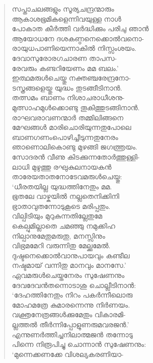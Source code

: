 \begin{verse}
സപ്താചലങ്ങളും സൂര്യചന്ദ്രന്മാരും\\
ആകാശഭൂമികളെന്നിവയുള്ള നാള്‍\\
പോകാത കീര്‍ത്തി വര്‍ദ്ധിക്കും പരിചു ഞാന്‍\\
ആയോധനേ ദശകണ്ഠനെക്കൊല്‍വനൊ-\\
രായുധപാണിയെന്നാകില്‍ നിസ്സംശയം.\\
ദേവാസുരോരഗചാരണ താപസ-\\
രേവരും കണ്ടറിയേണം മമ ബലം.’\\
ഇത്ഥമരുള്‍ചെയ്തു നക്തഞ്ചരേന്ദ്രനോ-\\
ടസ്ത്രങ്ങളെയ്തു യുദ്ധം തുടങ്ങീടിനാന്‍.\\
തത്സമം ബാണം നിശാചരാധീശനു-\\
മുത്സാഹമുള്‍ക്കൊണ്ടു തൂകിത്തുടങ്ങിനാന്‍.\\
രാഘവരാവണന്മാര്‍ തമ്മിലിങ്ങനെ\\
മേഘങ്ങള്‍ മാരിചൊരിയുന്നതുപോലെ\\
ബാണഗണംപൊഴിച്ചീടുന്നതുനേരം\\
ഞാണൊലികൊണ്ടു മുഴങ്ങി ജഗത്ത്രയം.\\
സോദരന്‍ വീണു കിടക്കുന്നതോര്‍ത്തുള്ളി-\\
ലാധി മുഴുത്തു രഘുകുലനായകന്‍\\
താരേയതാതനോടേവമരുള്‍ചെയ്തു:\\
‘ധീരതയില്ല യുദ്ധത്തിനേതും മമ.\\
ഭൂതലേ വാഴ്കയില്‍ നല്ലതെനിക്കിനി\\
ഭ്രാതാവുതന്നോടുകൂടെ മരിപ്പതും.\\
വില്പിടിയും മുറുകുന്നതില്ലേതുമേ\\
കെല്പുമില്ലാതെ ചമഞ്ഞു നമുക്കിഹ\\
നില്പാനുമേതുമരുതു, മനസ്സിനും\\
വിഭ്രമമേറി വരുന്നിതു മേല്ക്കുമേല്‍.\\
ദുഷ്ടനെക്കൊല്‍വാനുപായവും കണ്ടീല\\
നഷ്ടമായ് വന്നിതു മാനവും മാനസേ.’\\
ഏവമരുള്‍ചെയ്തനേരം സുഷേണനും\\
ദേവദേവന്‍തന്നൊടാശു ചൊല്ലീടിനാന്‍:\\
‘ദേഹത്തിനേതും നിറം പകര്‍ന്നീലൊരു\\
മോഹമത്രേ കുമാരന്നെന്നു നിര്‍ണയം.\\
വക്ത്രനേത്രങ്ങള്‍ക്കുമേതും വികാരമി-\\
ല്ലത്തല്‍ തീര്‍ന്നിപ്പോളുണരുമവരജന്‍.’\\
എന്നുണര്‍ത്തിച്ചനിലാത്മജന്‍ തന്നോടു\\
പിന്നെ നിരൂപിച്ചു ചൊന്നാന്‍ സുഷേണനും:\\
‘മുന്നെക്കണക്കേ വിശല്യകരണിയാ-\\

\end{verse}
